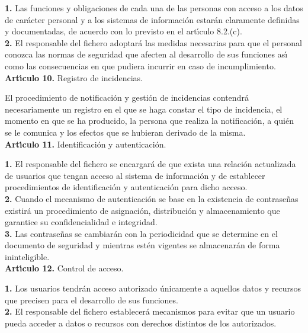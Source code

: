 {\bf 1.} Las funciones y obligaciones de cada una de las personas con acceso a 
los datos de car\'acter personal y a los sistemas de informaci\'on estar\'an 
claramente definidas y documentadas, de acuerdo con lo previsto en el 
art\'{\i}culo 8.2.(c).\\

{\bf 2.} El responsable del fichero adoptar\'a las medidas necesarias para que 
el personal conozca las normas de seguridad que afecten al desarrollo de sus 
funciones as\'{\i} como las consecuencias en que pudiera incurrir en caso de 
incumplimiento.
\vspace{0.3cm}\\
{\large {\bf Art\'{\i}culo 10.} Registro de incidencias.}

El procedimiento de notificaci\'on y gesti\'on de incidencias contendr\'a 
necesariamente un registro en el que se haga constar el tipo de incidencia, el 
momento en que se ha producido, la persona que realiza la notificaci\'on, a 
qui\'en se le comunica y los efectos que se hubieran derivado de la misma.
\vspace{0.3cm}\\
{\large {\bf Art\'{\i}culo 11.} Identificaci\'on y autenticaci\'on.}

{\bf 1.} El responsable del fichero se encargar\'a de que exista una relaci\'on 
actualizada de usuarios que tengan acceso al sistema de informaci\'on y de 
establecer procedimientos de identificaci\'on y autenticaci\'on para dicho 
acceso.\\

{\bf 2.} Cuando el mecanismo de autenticaci\'on se base en la existencia de 
contrase\~nas existir\'a un procedimiento de asignaci\'on, distribuci\'on y 
almacenamiento que garantice su confidencialidad e integridad.\\

{\bf 3.} Las contrase\~nas se cambiar\'an con la periodicidad que se determine 
en el documento de seguridad y mientras est\'en vigentes se almacenar\'an de 
forma ininteligible.
\vspace{0.3cm}\\
{\large {\bf Art\'{\i}culo 12.} Control de acceso.}

{\bf 1.} Los usuarios tendr\'an acceso autorizado \'unicamente a aquellos datos 
y recursos que precisen para el desarrollo de sus funciones.\\

{\bf 2.} El responsable del fichero establecer\'a mecanismos para evitar que un 
usuario pueda acceder a datos o recursos con derechos distintos de los 
autorizados.\\

